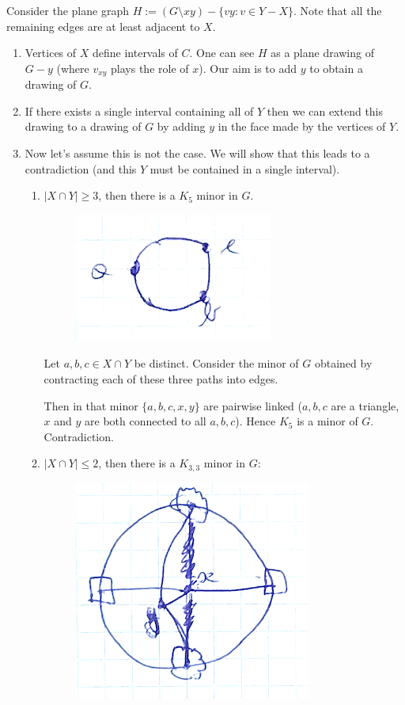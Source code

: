 \documentclass[11pt]{book}
\begin{document}
\begin{enumerate}
\begin{enumerate}
Consider the plane graph $H := (G \setminus xy) - \{ vy : v \in Y -X \}$. Note that all the remaining edges are at least adjacent to $X$.
						\begin{enumerate}
							\item Vertices of $X$ define intervals of $C$. One can see $H$ as a plane drawing of $G - y$ (where $v_{xy}$ plays the role of $x$). Our aim is to add $y$ to obtain a drawing of $G$.
							\item If there exists a single interval containing all of $Y$ then we can extend this drawing to a drawing  of $G$ by adding $y$ in the face made by the vertices of $Y$.
							\item Now let's assume this is not the case. We will show that this leads to a contradiction (and this $Y$ must be contained in a single interval).
								\begin{enumerate}
									\item $|X \cap Y| \geq 3$, then there is a $K_5$ minor in $G$.
									\begin{figure}[h]
	\center
	\includegraphics[width=0.3\linewidth]{img/4-3.png}
\end{figure}

Let $a,b,c \in X \cap Y$ be distinct. Consider the minor of $G$ obtained by contracting each of these three paths into edges.
			
			Then in that minor $\{ a,b,c,x,y \}$ are pairwise linked ($a,b,c$ are a triangle, $x$ and $y$ are both connected to all $a,b,c$). Hence $K_5$ is a minor of $G$. Contradiction.
									


									\item $|X \cap Y| \leq 2$, then there is a $K_{3,3}$ minor in $G$: 
									\begin{figure}[h]
	\center
	\includegraphics[width=0.3\linewidth]{img/4-4.png}
\end{figure}
								\end{enumerate}
						\end{enumerate} 
				\end{enumerate}
		\end{enumerate}
		
\end{document}

